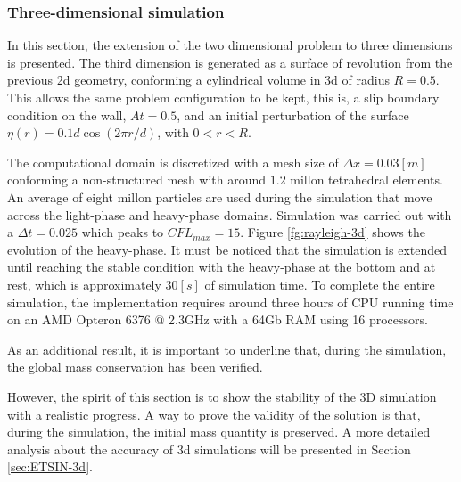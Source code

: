 \subsubsection{Three-dimensional simulation}

In this section, the extension of the two dimensional problem to three dimensions is presented. The third dimension is generated as a surface of revolution from the previous 2d geometry, conforming a cylindrical volume in 3d of radius $R=0.5$. This allows the same problem configuration to be kept, this is, a slip boundary condition on the wall, $At=0.5$, and an initial perturbation of the surface $\eta(r) = 0.1d \cos(2\pi r/d)$, with $0<r<R$.

The computational domain is discretized with a mesh size of $\Delta x=0.03[m]$ conforming a non-structured mesh with around $1.2$ millon tetrahedral elements. An average of eight millon particles are used during the simulation that move across the light-phase and heavy-phase domains. Simulation was carried out with a $\Delta t=0.025$ which peaks to $CFL_{max}=15$. Figure \ref{fg:rayleigh-3d} shows the evolution of the heavy-phase. It must be noticed that the simulation is extended until reaching the stable condition with the heavy-phase at the bottom and at rest, which is approximately $30[s]$ of simulation time. To complete the entire simulation, the implementation requires around three hours of CPU running time on an AMD Opteron 6376 @ 2.3GHz with a 64Gb RAM using 16 processors.

As an additional result, it is important to underline that, during the simulation, the global mass conservation has been verified.

 However, the spirit of this section is to show the stability of the 3D simulation with a realistic progress. A way to prove the validity of the solution is that, during the simulation, the initial mass quantity is preserved. A more detailed analysis about the accuracy of 3d simulations will be presented in Section \ref{sec:ETSIN-3d}.

